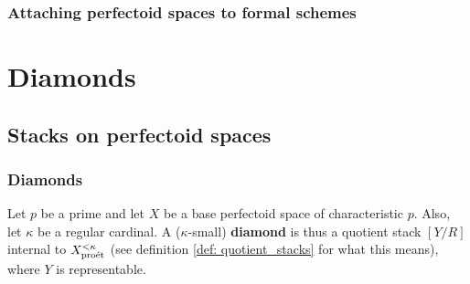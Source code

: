             \subsubsection{Attaching perfectoid spaces to formal schemes}
        
    \section{Diamonds} \label{section: diamonds}
        \subsection{Stacks on perfectoid spaces}        
            \subsubsection{Diamonds}
                \begin{definition}[Diamonds] \label{def: diamonds}
                    Let $p$ be a prime and let $X$ be a base perfectoid space of characteristic $p$. Also, let $\kappa$ be a regular cardinal. A ($\kappa$-small) \textbf{diamond} is thus a quotient stack $[Y/R]$ internal to $X_{\mathrm{pro\acute{e}t}}^{< \kappa}$ (see definition \ref{def: quotient_stacks} for what this means), where $Y$ is representable.
                \end{definition}
                
